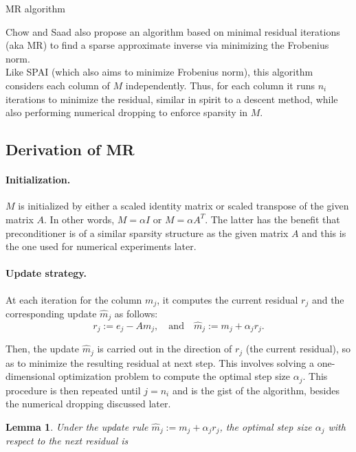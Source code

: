 \documentclass[paper=A4, fontsize=11pt]{scrartcl}
\newtheorem{lemma}{Lemma}[section]
\theoremstyle{remark}
\begin{document}
\newpage

\begin{section}{MR algorithm}
	
	Chow and Saad \cite{chow} also propose an algorithm based on minimal residual iterations (aka MR) to find a sparse approximate inverse via minimizing the Frobenius norm.\\
	
	Like SPAI \cite{grote} (which also aims to minimize Frobenius norm), this algorithm considers each column of $M$ independently. Thus, for each column it runs $n_{i}$ iterations to minimize the residual, similar in spirit to a descent method, while also performing numerical dropping to enforce sparsity in $M$. 
	
	\subsection{Derivation of MR}
	
	\paragraph{Initialization.}
	$M$ is initialized by either a scaled identity matrix or scaled transpose of the given matrix $A$. In other words, $M = \alpha I$ or $M =\alpha A^{T}$. The latter has the benefit that preconditioner is of a similar sparsity structure as the given matrix $A$ and this is the one used for numerical experiments later.  
	
	\paragraph{Update strategy.}
	At each iteration for the column $m_{j}$, it computes the current residual $r_j$ and the corresponding update  $\hat{m}_{j}$ as follows:
	\begin{equation}
	r_{j} :=e_{j}-A m_{j}, \quad \text{and} \quad \hat{m}_{j} :=m_{j}+\alpha_{j} r_{j}.
	\end{equation}

	Then, the update $\hat{m}_{j}$ is carried out in the direction of $r_j$ (the current residual), so as to minimize the resulting residual at next step. This involves solving a one-dimensional optimization problem to compute the optimal step size $\alpha_{j}$. This procedure is then repeated until $j = n_{i}$ and  is the gist of the algorithm, besides the numerical dropping discussed later. 
	
	\begin{lemma}
Under the update rule $\hat{m}_{j} :=m_{j}+\alpha_{j} r_{j}$, 	the optimal step size $\alpha_{j}$ with respect to the next residual is 
	

\end{lemma}
\end{section}
\end{document}
